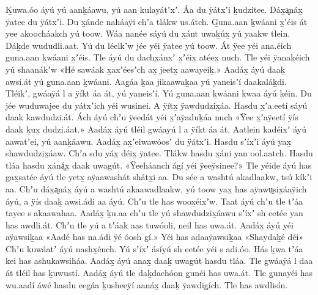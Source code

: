 \clearpage
\begin{pairs}
\begin{Leftside}
\beginnumbering
\pstart
\noindent
{}Ḵuwa.óo áyú yú aanḵáawu, yú aan kulayátʼxʼ.
Áa du ÿátxʼi ḵudzitee.
Dáx̱a̬náx̱ ÿatee du ÿátxʼi.
Du x̱ánde naháaÿi chʼa tlákw us.átch.
G̱una.aan ḵwáani x̱ʼéis át yee akoocháakch yú toow.
Wáa nanée sáyú du x̱ánt uwaḵúx̱ yú yaakw tlein.
Dáḵde wududli.aat.
Yú du léelkʼw jée yéi ÿatee yú toow.
Át ÿee yéi ana.éich g̱una.aan ḵwáani x̱ʼéis.
Tle áyú du dachx̱ánxʼ x̱ʼéix̱ atéex̱ nuch.
Tle yéi ÿanaḵéich yú shaanákʼw
«\!Hé sawáak x̱a\-xʼéesʼch ax̱ jeetx̱ aawayeiḵ.\!»
\pend
\pstart
\hspace{-0.5em}Aadáx̱ áyú daaḵ awsi.át yú g̱una.aan ḵwáa\-ni.
Aag̱áa ḵaa jikaawaḵaa yú yaneisʼí daa\-kaláḵdi.
Tléikʼ, gwáaÿá l a ÿíkt áa át, yú yaneisʼí.
Yú g̱una.aan ḵwáani ḵwaa áyú ḵéin.
Du jée wuduwajee du yátxʼich yéi wusinei.
A ÿítx̱ ÿawdudzix̱áa.
Hasdu x̱ʼa.eetí sáyú daak kawdudzi.át.
Ách áyú chʼu ÿeedát yéi x̱ʼaÿaduḵáa nuch
«\!Ÿee x̱ʼaÿeetí ÿís daak ḵux̱ dudzi.áat.\!»
Aadáx̱ áyú tléil gwáayú l a ÿíkt áa át.
Aatlein kadéixʼ áyú aawatʼei, yú aanḵáawu.
Aadáx̱ ax̱ʼeiwawóosʼ du ÿátxʼi.
Hasdu sʼíxʼi áyú yax̱ shawdudzix̱áaw.
Chʼa sdu yáx̱ déix̱ ÿatee.
Tlákw hasdu x̱áni yan ool.aatch.
Has\-du tláa hasdu x̱áná̬x̱ daak uwagút.
«\!Ÿeeháanch ágí yéi ÿeeÿsinee?\!»
Tle yéide áyú has gax̱satée áyú tle yetx̱ aÿaa\-washát shátx̱i aa.
Du sée a washtú aka\-dlaakw, tsú kíkʼi aa.
Chʼu dáx̱a̬náx̱ áyú a washtú akaawadlaakw, yú toow yax̱ has aÿawu̬six̱áaÿich áyú, a ÿís daaḵ awsi.ádi aa áyú.
Chʼu tle has woox̱éixʼw.
Taat áyú chʼu tle tʼáa tayee s akaawahaa.
Aadáx̱ ḵu.aa chʼu tle yú shawdudzix̱áawu sʼíxʼ sh eetée yan has awdli.át.
Chʼu tle yú a tʼáak aas tuwóoli, neil has uwa.át.
\pend
\pstart
{}Aadáx̱ áyú yéi aÿawsiḵaa
«\!Aadé has na.ádi ÿé óosh gí.\!»
Yéi has adaaÿawsiḵaa
«\!Shaydaḵé déi\!»
Chʼu kuwáatʼ áyú nash\-x̱énch.
Yú sʼíxʼ ásíyú sh eetée yéi s adi.óo.
Hás ḵwa tʼáa kei has ashukawsiháa.
Aadáx̱ áyú anax̱ daaḵ uwagút hasdu tláa.
Tle gwáa\-ÿá l daa át tléil has ḵuwustí.
Aadáx̱ áyú tle daḵdachóon g̱unéi has uwa.át.
Tle g̱unayéi has wu.aadí áwé hasdu eeg̱áa ḵusheeÿí aanáx̱ daaḵ ÿawdig̱ích.
Tle has awdlisín.

\end{Leftside}
\end{pairs}
